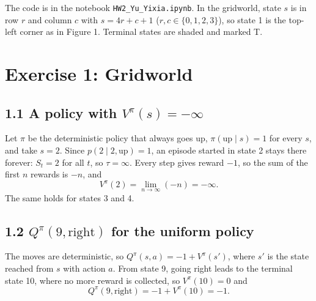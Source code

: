 \documentclass[letterpaper, 11pt]{article}
\newcommand{\1}{\mathds{1}}	%
\theoremstyle{definition}
\begin{document}
The code is in the notebook \texttt{HW2\_Yu\_Yixia.ipynb}. In the gridworld, state $s$ is in row $r$ and column $c$ with $s = 4r + c + 1$ ($r, c \in \{0, 1, 2, 3\}$), so state 1 is the top-left corner as in Figure 1. Terminal states are shaded and marked T.

\section*{Exercise 1: Gridworld}

\subsection*{1.1 A policy with $V^\pi(s) = -\infty$}

Let $\pi$ be the deterministic policy that always goes up, $\pi(\text{up} \mid s) = 1$ for every $s$, and take $s = 2$. Since $p(2 \mid 2, \text{up}) = 1$, an episode started in state 2 stays there forever: $S_t = 2$ for all $t$, so $\tau = \infty$. Every step gives reward $-1$, so the sum of the first $n$ rewards is $-n$, and
\[
V^\pi(2) = \lim_{n \to \infty} (-n) = -\infty.
\]
The same holds for states 3 and 4.

\subsection*{1.2 $Q^\pi(9, \text{right})$ for the uniform policy}

The moves are deterministic, so $Q^\pi(s, a) = -1 + V^\pi(s')$, where $s'$ is the state reached from $s$ with action $a$. From state 9, going right leads to the terminal state 10, where no more reward is collected, so $V^\pi(10) = 0$ and
\[
Q^\pi(9, \text{right}) = -1 + V^\pi(10) = -1.
\]
\end{document}
